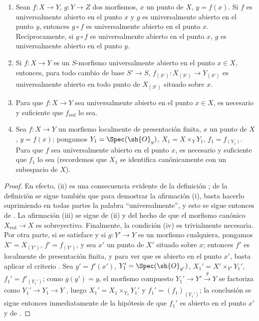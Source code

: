 \begin{proposition}[14.3.4]
\label{IV.14.3.4}
\begin{enumerate}[label=\textup{(\roman*)}]
  \item Sean $f:X\to Y$, $g:Y\to Z$ dos morfismos, $x$ un punto de $X$, $y=f(x)$.
  Si $f$ es universalmente abierto en el punto $x$ y $g$ es universalmente abierto en el punto $y$, entonces $g\circ f$ es universalmente abierto en el punto $x$.
  Recíprocamente, si $g\circ f$ es universalmente abierto en el punto $x$, $g$ es universalmente abierto en el punto $y$.

  \item Si $f:X\to Y$ es un $S$-morfismo universalmente abierto en el punto $x\in X$, entonces, para todo cambio de base $S'\to S$, $f_{(S')}:X_{(S')}\to Y_{(S')}$ es universalmente abierto en todo punto de $X_{(S')}$ situado sobre $x$.

  \item Para que $f:X\to Y$ sea universalmente abierto en el punto $x\in X$, es necesario y suficiente que $f_{\mathrm{red}}$ lo sea.

  \item Sea $f:X\to Y$ un morfismo localmente de presentación finita, $x$ un punto de $X$, $y=f(x)$; pongamos $Y_1=\Spec(\sh{O}_y)$, $X_1=X\times_Y Y_1$, $f_1=f_{(Y_1)}$.
  Para que $f$ sea universalmente abierto en el punto $x$, es necesario y suficiente que $f_1$ lo sea \textup{(recordemos  que $X_1$ se identifica canónicamente con un subespacio de $X$)}.
\end{enumerate}
\end{proposition}

\begin{proof}
En efecto, (ii) es una consecuencia evidente de la definición ; de la definición se sigue también que para demostrar la afirmación (i), basta hacerlo suprimiendo en todas partes la palabra ``universalmente'', y esto se sigue entonces de .
La afirmación (iii) se sigue de (ii) y del hecho de que el morfismo canónico $X_{\mathrm{red}}\to X$ es sobreyectivo.
Finalmente, la condición (iv) es trivialmente necesaria.
Por otra parte, si se satisface y si $g:Y'\to Y$ es un morfismo cualquiera, pongamos $X'=X_{(Y')}$, $f'=f_{(Y')}$, y sea $x'$ un punto de $X'$ situado sobre $x$; entonces $f'$ es localmente de presentación finita, y para ver que es abierto en el punto $x'$, basta aplicar el criterio {}.
Sea $y'=f'(x')$, $Y_1'=\Spec(\sh{O}_{y'})$, $X_1'=X'\times_{Y'}Y_1'$, $f_1'=f'_{(Y_1')}$; como $g(y')=y$, el morfismo compuesto $Y_1'\to Y'\xrightarrow{g}Y$ se factoriza como $Y_1'\to Y_1\to Y$ , luego $X_1'=X_1\times_{Y_1}Y_1'$ y $f_1'=(f_1)_{(Y_1')}$; la conclusión se sigue entonces inmediatamente de la hipótesis de que $f_1'$ es abierto en el punto $x'$ y de .
\end{proof}

